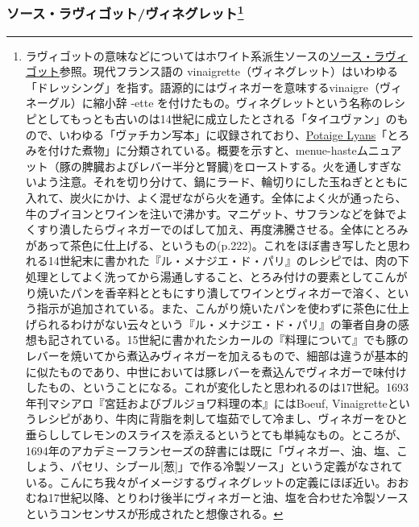 \begin{recette}
{\subsubsection[ソース・ラヴィゴット/ヴィネグレット]{\texorpdfstring{ソース・ラヴィゴット/ヴィネグレット\footnote{ラヴィゴットの意味などについてはホワイト系派生ソースの\protect\hyperlink{sauce-ravigote}{ソース・ラヴィゴット}参照。現代フランス語の
  vinaigrette（ヴィネグレット）はいわゆる「ドレッシング」を指す。語源的にはヴィネガーを意味するvinaigre（ヴィネーグル）に縮小辞
  -ette
  を付けたもの。ヴィネグレットという名称のレシピとしてもっとも古いのは14世紀に成立したとされる「タイユヴァン」のもので、いわゆる「ヴァチカン写本」に収録されており、\ul{Potaige Lyans}「とろみを付けた煮物」に分類されている。概要を示すと、menue-hasteムニュアット（豚の脾臓およびレバー半分と腎臓)をローストする。火を通しすぎないよう注意。それを切り分けて、鍋にラード、輪切りにした玉ねぎとともに入れて、炭火にかけ、よく混ぜながら火を通す。全体によく火が通ったら、牛のブイヨンとワインを注いで沸かす。マニゲット、サフランなどを鉢でよくすり潰したらヴィネガーでのばして加え、再度沸騰させる。全体にとろみがあって茶色に仕上げる、というもの(p.222)。これをほぼ書き写したと思われる14世紀末に書かれた『ル・メナジエ・ド・パリ』のレシピでは、肉の下処理としてよく洗ってから湯通しすること、とろみ付けの要素としてこんがり焼いたパンを香辛料とともにすり潰してワインとヴィネガーで溶く、という指示が追加されている。また、こんがり焼いたパンを使わずに茶色に仕上げられるわけがない云々という『ル・メナジエ・ド・パリ』の筆者自身の感想も記されている。15世紀に書かれたシカールの『料理について』でも豚のレバーを焼いてから煮込みヴィネガーを加えるもので、細部は違うが基本的に似たものであり、中世においては豚レバーを煮込んでヴィネガーで味付けしたもの、ということになる。これが変化したと思われるのは17世紀。1693年刊マシアロ『宮廷およびブルジョワ料理の本』にはBoeuf,
  Vinaigretteというレシピがあり、牛肉に背脂を刺して塩茹でして冷まし、ヴィネガーをひと垂らししてレモンのスライスを添えるというとても単純なもの。ところが、1694年のアカデミーフランセーズの辞書には既に「ヴィネガー、油、塩、こしょう、パセリ、シブール{[}葱{]}」で作る冷製ソース」という定義がなされている。こんにち我々がイメージするヴィネグレットの定義にほぼ近い。おおむね17世紀以降、とりわけ後半にヴィネガーと油、塩を合わせた冷製ソースというコンセンサスが形成されたと想像される。}}{ソース・ラヴィゴット/ヴィネグレット}}\label{sauce-ravigote-froide}}


 


\end{recette}
